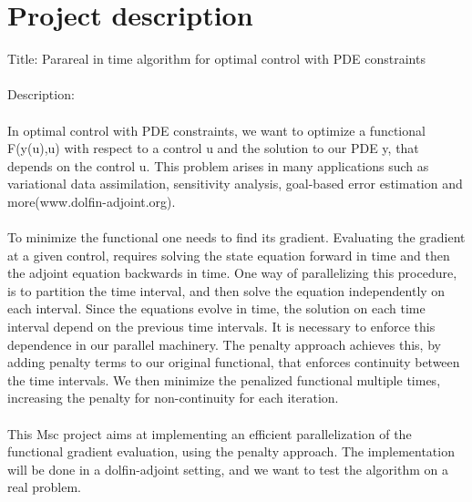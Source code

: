 \section{Project description}
Title:
Parareal in time algorithm for optimal control with PDE constraints
\\
\\
Description:
\\
\\
In optimal control with PDE constraints, we want to optimize a functional F(y(u),u) with respect to a control u and the solution to our PDE y, that depends on the control u. This problem arises in many applications such as variational data assimilation, sensitivity analysis, goal-based error estimation and more(www.dolfin-adjoint.org).
\\
\\
To minimize the functional one needs to find its gradient. Evaluating the gradient at a given control, requires solving the state equation forward in time and then the adjoint equation backwards in time. One way of parallelizing this procedure, is to partition the time interval, and then solve the equation independently on each interval. Since the equations evolve in time, the solution on each time interval depend on the previous time intervals. It is necessary to enforce this dependence in our parallel machinery. The penalty approach achieves this, by adding penalty terms to our original functional, that enforces continuity between the time intervals. We then minimize the penalized functional multiple times, increasing the penalty for non-continuity for each iteration.
\\
\\
This Msc project aims at implementing an efficient parallelization of the functional gradient evaluation, using the penalty approach. The implementation will be done in a dolfin-adjoint setting, and we want to test the algorithm on a real problem.  